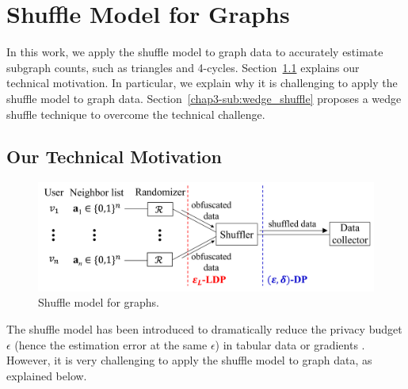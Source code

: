\section{Shuffle Model for Graphs}
\label{chap3-sec:shuffle}
In this work, we apply the shuffle model to graph data to accurately estimate subgraph counts, such as triangles and 4-cycles. 
Section~\ref{chap3-sub:technical} explains our technical motivation. 
In particular, we explain why it is challenging to apply the shuffle model to graph data. 
Section~\ref{chap3-sub:wedge_shuffle} proposes a wedge shuffle technique to overcome the technical challenge. 

\subsection{Our Technical Motivation}
\label{chap3-sub:technical}

\begin{figure}[t]
  \centering
  \includegraphics[width=0.99\linewidth]{fig/shuffle.pdf}
  
  \caption[Shuffle model for graphs.]{Shuffle model for graphs. 
  }
  \label{chap3-fig:shuffle_model}
\end{figure}

The shuffle model has been introduced to dramatically reduce the privacy budget $\epsilon$ (hence the estimation error at the same $\epsilon$) in tabular data \cite{Meehan_ICLR22,Wang_PVLDB20} or 
gradients 
\cite{Girgis_AISTATS21,Liu_AAAI21}. 
However, it is very challenging to apply the shuffle model to graph data, 
as explained below. 

